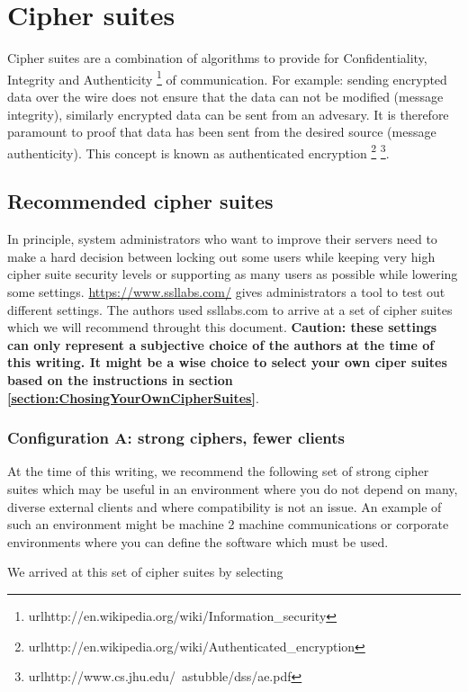 \section{Cipher suites}

Cipher suites are a combination of algorithms to provide for 
Confidentiality, Integrity and Authenticity
\footnote{url{http://en.wikipedia.org/wiki/Information_security}} of 
communication. For example: sending encrypted data over the wire does not 
ensure that the data can not be modified (message integrity), similarly
encrypted data can be sent from an advesary. It is therefore paramount to
proof that data has been sent from the desired source (message authenticity).
This concept is known as authenticated encryption
\footnote{url{http://en.wikipedia.org/wiki/Authenticated_encryption}}
\footnote{url{http://www.cs.jhu.edu/~astubble/dss/ae.pdf}}.

\subsection{Recommended cipher suites}

In principle, system administrators who want to improve their servers need to
make a hard decision between locking out some users while keeping very high
cipher suite security levels or supporting as many users as possible while
lowering some settings. \url{https://www.ssllabs.com/} gives administrators a
tool to test out different settings. The authors used ssllabs.com to arrive at
a set of cipher suites which we will recommend throught this document.
\textbf{Caution: these settings can only represent a subjective choice of the
authors at the time of this writing. It might be a wise choice to select your
own ciper suites based on the instructions in section
\ref{section:ChosingYourOwnCipherSuites}}.


\subsubsection{Configuration A: strong ciphers, fewer clients}

At the time of this writing, we recommend the following set of strong cipher
suites which may be useful in an environment where you do not depend on many,
diverse external clients and where compatibility is not an issue.  An example
of such an environment might be machine 2 machine communications or corporate
environments where you can define the software which must be used.


We arrived at this set of cipher suites by selecting


